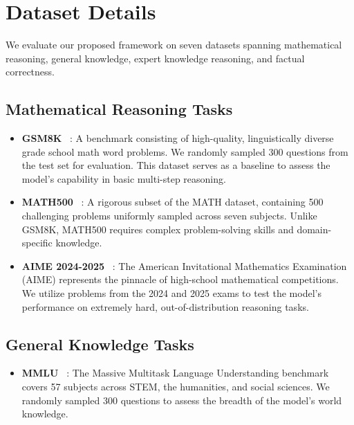 \section{Dataset Details}
\label{app:datasets}

We evaluate our proposed framework on seven datasets spanning mathematical reasoning, general knowledge, expert knowledge reasoning, and factual correctness.

\subsection{Mathematical Reasoning Tasks}
\begin{itemize}
    \item \textbf{GSM8K}~ \cite{cobbe2021gsm8k}: A benchmark consisting of high-quality, linguistically diverse grade school math word problems. We randomly sampled 300 questions from the test set for evaluation. This dataset serves as a baseline to assess the model's capability in basic multi-step reasoning.
    \item \textbf{MATH500}~ \cite{lightman2023lets}: A rigorous subset of the MATH dataset, containing 500 challenging problems uniformly sampled across seven subjects. Unlike GSM8K, MATH500 requires complex problem-solving skills and domain-specific knowledge.
    \item \textbf{AIME 2024-2025}~ \cite{aime2024,aime2025}: The American Invitational Mathematics Examination (AIME) represents the pinnacle of high-school mathematical competitions. We utilize problems from the 2024 and 2025 exams to test the model's performance on extremely hard, out-of-distribution reasoning tasks.
\end{itemize}

\subsection{General Knowledge Tasks}
\begin{itemize}
    \item \textbf{MMLU}~ \cite{hendrycks2020measuring}: The Massive Multitask Language Understanding benchmark covers 57 subjects across STEM, the humanities, and social sciences. We randomly sampled 300 questions to assess the breadth of the model's world knowledge.
\end{itemize}

